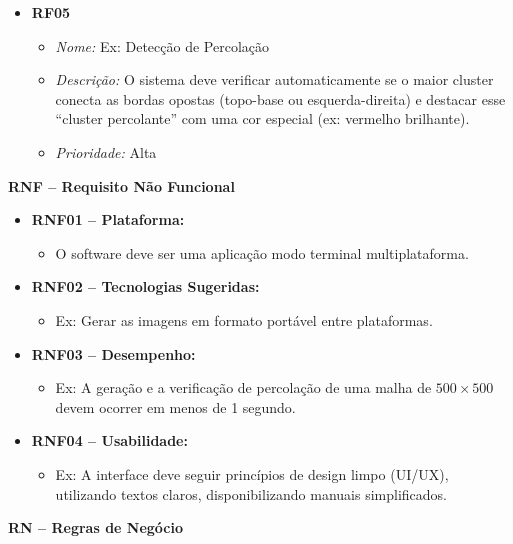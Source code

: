 \documentclass[12pt,a4paper]{article}
\begin{document}
\begin{itemize}[leftmargin=*]
\begin{itemize}
\begin{itemize}
      \item \textbf{RF05}
      \begin{itemize}
        \item \textit{Nome:} Ex: Detecção de Percolação
        \item \textit{Descrição:} O sistema deve verificar automaticamente se o maior cluster conecta as bordas opostas (topo-base ou esquerda-direita) e destacar esse ``cluster percolante'' com uma cor especial (ex: vermelho brilhante).
        \item \textit{Prioridade:} Alta
      \end{itemize}
    \end{itemize}

    \medskip
    \textbf{RNF -- Requisito Não Funcional}

    \begin{itemize}
      \item \textbf{RNF01 -- Plataforma:}
      \begin{itemize}
        \item O software deve ser uma aplicação modo terminal multiplataforma.
      \end{itemize}

      \item \textbf{RNF02 -- Tecnologias Sugeridas:}
      \begin{itemize}
        \item Ex: Gerar as imagens em formato portável entre plataformas.
      \end{itemize}

      \item \textbf{RNF03 -- Desempenho:}
      \begin{itemize}
        \item Ex: A geração e a verificação de percolação de uma malha de $500 \times 500$ devem ocorrer em menos de 1 segundo.
      \end{itemize}

      \item \textbf{RNF04 -- Usabilidade:}
      \begin{itemize}
        \item Ex: A interface deve seguir princípios de design limpo (UI/UX), utilizando textos claros, disponibilizando manuais simplificados.
      \end{itemize}
    \end{itemize}

    \medskip
    \textbf{RN -- Regras de Negócio}


\end{itemize}
\end{itemize}
\end{document}
